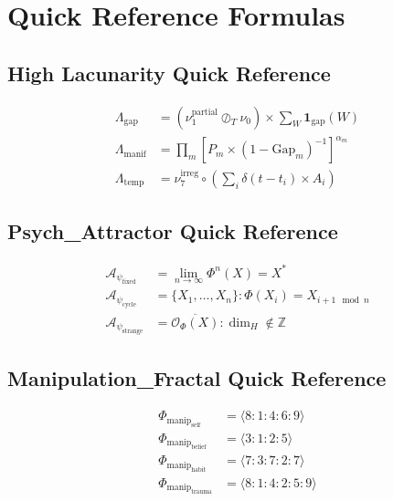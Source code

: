 \documentclass[11pt,twoside]{book}
\newcommand{\noe}[1]{\nu_{#1}}
\newcommand{\Frac}{\Phi}
\newcommand{\HausdorffDim}{\dim_H}
\newcommand{\Tdiv}{\oslash_T}
\newcommand{\Lacunarity}{\Lambda}
\newcommand{\PsychAttractor}{\mathcal{A}_\psi}
\newcommand{\ManipFrac}{\Phi_{\mathrm{manip}}}
\begin{document}
\appendix

\chapter{Quick Reference Formulas}
\label{app:quick-ref}

\section{High Lacunarity Quick Reference}
\begin{align}
    \Lacunarity_{\mathrm{gap}} &= (\noe{1}^{\mathrm{partial}} \Tdiv \noe{0}) \times \sum_W \mathbf{1}_{\mathrm{gap}}(W) \\
    \Lacunarity_{\mathrm{manif}} &= \prod_m [P_m \times (1 - \mathrm{Gap}_m)^{-1}]^{\alpha_m} \\
    \Lacunarity_{\mathrm{temp}} &= \noe{7}^{\mathrm{irreg}} \circ (\sum_i \delta(t-t_i) \times A_i)
\end{align}

\section{Psych\_Attractor Quick Reference}
\begin{align}
    \PsychAttractor_{\mathrm{fixed}} &= \lim_{n \to \infty} \Frac^n(X) = X^* \\
    \PsychAttractor_{\mathrm{cycle}} &= \{X_1, \ldots, X_n\} : \Frac(X_i) = X_{i+1 \mod n} \\
    \PsychAttractor_{\mathrm{strange}} &= \overline{\mathcal{O}_\Frac(X)} : \HausdorffDim \notin \mathbb{Z}
\end{align}

\section{Manipulation\_Fractal Quick Reference}
\begin{align}
    \ManipFrac_{\mathrm{self}} &= \langle 8:1:4:6:9 \rangle \\
    \ManipFrac_{\mathrm{belief}} &= \langle 3:1:2:5 \rangle \\
    \ManipFrac_{\mathrm{habit}} &= \langle 7:3:7:2:7 \rangle \\
    \ManipFrac_{\mathrm{trauma}} &= \langle 8:1:4:2:5:9 \rangle
\end{align}
\end{document}
